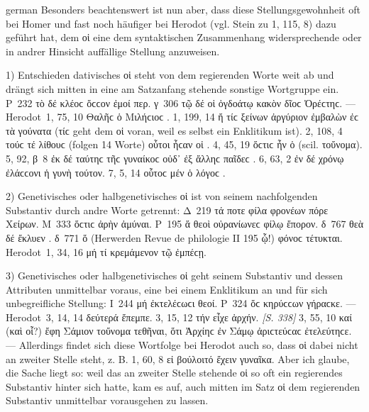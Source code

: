 \begin{otherlanguage*}{german}
Besonders beachtenswert ist nun aber, dass diese Stellungsgewohnheit oft bei Homer und fast noch häufiger bei Herodot (vgl. Stein zu 1, 115, 8) dazu geführt hat, dem οἱ eine dem syntaktischen Zusammenhang widersprechende oder in andrer Hinsicht auffällige Stellung anzuweisen.

1)	Entschieden dativisches οἱ steht von dem regierenden Worte weit ab und drängt sich mitten in eine am Satzanfang stehende sonstige Wortgruppe ein. Ρ~232 τὸ δέ  κλέοϲ  ὅϲϲον ἐμοί περ. γ~306 τῷ δέ οἱ ὀγδοάτῳ κακὸν  δῖοϲ Ὀρέϲτηϲ. — Herodot~1, 75, 10 Θαλῆϲ  ὁ Μιλήϲιοϲ . 1, 199, 14 ἤ τίϲ  ξείνων ἀργύριον ἐμβαλὼν ἐϲ τὰ γούνατα  (τίϲ geht dem οἱ voran, weil es selbst ein Enklitikum ist). 2, 108, 4 τούϲ τέ  λίθουϲ (folgen 14 Worte) οὗτοι ἦϲαν οἱ . 4, 45, 19 ὅϲτιϲ  ἦν ὁ  (scil. τοὔνομα). 5, 92, β~8 ἐκ δέ  ταύτηϲ τῆϲ γυναίκοϲ οὐδ᾽ ἐξ ἄλληϲ παῖδεϲ . 6, 63, 2 ἐν δέ  χρόνῳ ἐλάϲϲονι ἡ γυνὴ  τούτον. 7, 5, 14 οὗτοϲ μέν  ὁ λόγοϲ  .

2)	Genetivisches oder halbgenetivisches οἱ ist von seinem nachfolgenden Substantiv durch andre Worte getrennt: Δ~219 τά  ποτε  φίλα φρονέων πόρε Χείρων. Μ~333 ὅϲτιϲ  ἀρὴν  ἀμύναι. Ρ~195 ἅ  θεοὶ οὐρανίωνεϲ  φίλῳ ἔπορον. δ~767 θεὰ δέ  ἔκλυεν . δ~771 ὅ  (Herwerden Revue de philologie II 195 ᾧ!) φόνοϲ  τέτυκται. Herodot~1, 34, 16 μή τί  κρεμάμενον τῷ  ἐμπέϲῃ.

3)	Genetivisches oder halbgenetivisches οἱ geht seinem Substantiv und dessen Attributen unmittelbar voraus, eine bei einem Enklitikum an und für sich unbegreifliche Stellung: Ι~244 μή  ἐκτελέϲωϲι θεοί. Ρ~324 ὅϲ  κηρύϲϲων γήραϲκε. — Herodot~3, 14, 14 δεύτερά  ἔπεμπε. 3, 15, 12 τήν  εἶχε ἀρχήν. \hypertarget{p338}{\emph{[S. 338]}}\label{p338} 3, 55, 10 καί  (καὶ οἷ?)  ἔφη Σάμιον τοὔνομα τεθῆναι, ὅτι  Ἀρχίηϲ ἐν Σάμῳ ἀριϲτεύϲαϲ ἐτελεύτηϲε. — Allerdings findet sich diese Wortfolge bei Herodot auch so, dass οἱ dabei nicht an zweiter Stelle steht, z. B. 1, 60, 8 εἰ βούλοιτό  ἔχειν γυναῖκα. Aber ich glaube, die Sache liegt so: weil das an zweiter Stelle stehende οἱ so oft ein regierendes Substantiv hinter sich hatte, kam es auf, auch mitten im Satz οἱ dem regierenden Substantiv unmittelbar vorausgehen zu lassen.


\end{otherlanguage*}
